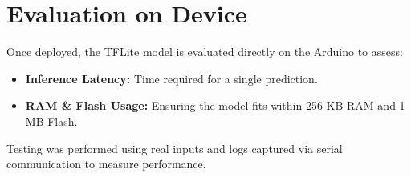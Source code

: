 \section{Evaluation on Device}

Once deployed, the TFLite model is evaluated directly on the Arduino to assess:

\begin{itemize}
\item \textbf{Inference Latency:} Time required for a single prediction.
\item \textbf{RAM \& Flash Usage:} Ensuring the model fits within 256 KB RAM and 1 MB Flash.

\end{itemize}

Testing was performed using real inputs and logs captured via serial communication to measure performance.